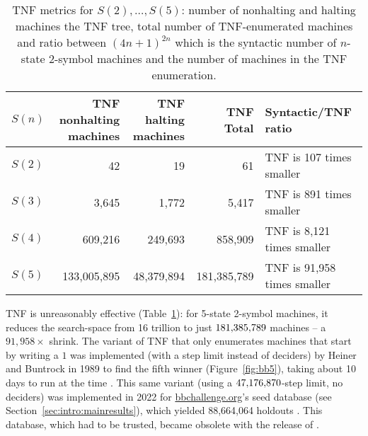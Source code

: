 \begin{table}[h!]
    \centering
    \begin{tabular}{|l|r|r|r|l|}
        \hline
        $S(n)$ & \makecell{TNF nonhalting                                                          \\ machines} & \makecell{TNF halting \\ machines} & TNF Total         & Syntactic/TNF ratio                 \\
        \hline
        $S(2)$ & 42                       & 19         & 61          & TNF is 107 times smaller    \\
        $S(3)$ & 3,645                    & 1,772      & 5,417       & TNF is 891 times smaller    \\
        $S(4)$ & 609,216                  & 249,693    & 858,909     & TNF is 8,121 times smaller  \\
        $S(5)$ & 133,005,895              & 48,379,894 & 181,385,789 & TNF is 91,958 times smaller \\
        \hline
    \end{tabular}

    \caption{TNF metrics for $S(2),\dots,S(5)$: number of nonhalting and halting machines the TNF tree, total number of TNF-enumerated machines and ratio between $(4n+1)^{2n}$ which is the syntactic number of $n$-state 2-symbol machines and the number of machines in the TNF enumeration.}\label{tab:TNF-numbers}
\end{table}

TNF is unreasonably effective (Table~\ref{tab:TNF-numbers}): for 5-state 2-symbol machines, it reduces the search-space from 16 trillion to just $181{,}385{,}789$ machines -- a $91{,}958\times$ shrink. The variant of TNF that only enumerates machines that start by writing a $1$ was implemented (with a step limit instead of deciders) by Heiner and Buntrock in 1989 to find the fifth \BBfull winner (Figure~\ref{fig:bb5}), taking about 10 days to run at the time \cite{Marxen_1990}. This same variant (using a $47{,}176{,}870$-step limit, no deciders) was implemented in 2022 for \url{bbchallenge.org}’s seed database (see Section~\ref{sec:intro:mainresults}), which yielded 88,664,064 holdouts  \cite{sterin_2022_14955828}. This database, which had to be trusted, became obsolete with the release of \CoqBB. %

